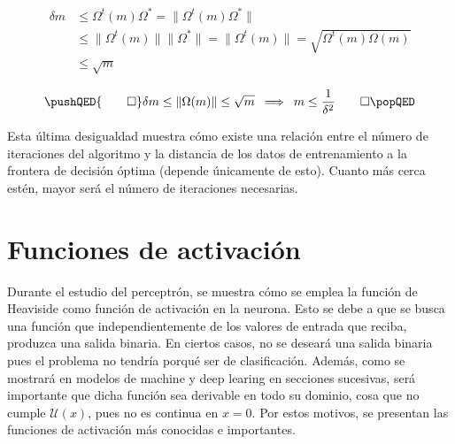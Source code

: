 		\begin{align*}
			\boxed{\delta m} &\leq \Omega^t(m)\Omega^* = \|\Omega^t(m)\Omega^*\|\\
			&\leq \|\Omega^t(m)\| \|\Omega^*\| = \|\Omega^t(m)\| = \sqrt{\Omega^t(m)\Omega(m)}\\
			& \leq \boxed{\sqrt{m}} 
		\end{align*}
		
		$$
		\pushQED{\qed} 
		\delta m \leq \|\Omega(m)\| \leq \sqrt{m} \,\,\, \Longrightarrow \,\,\, m \leq \frac{1}{\delta^2}\qedhere
		\popQED
		$$ 
		
		Esta última desigualdad muestra cómo existe una relación entre el número de iteraciones del algoritmo y la distancia de los datos de entrenamiento a la frontera de decisión óptima (depende únicamente de esto). Cuanto más cerca estén, mayor será el número de iteraciones necesarias. 
		
	\section{Funciones de activación}
	
		Durante el estudio del perceptrón, se muestra cómo se emplea la función de Heaviside como función de activación en la neurona. Esto se debe a que se busca una función que independientemente de los valores de entrada que reciba, produzca una salida binaria. En ciertos casos, no se deseará una salida binaria pues el problema no tendría porqué ser de clasificación. Además, como se mostrará en modelos de machine y deep learing en secciones sucesivas, será importante que dicha función sea derivable en todo su dominio, cosa que no cumple $\mathcal{U}(x)$, pues no es continua en $x=0$. Por estos motivos, se presentan las funciones de activación más conocidas e importantes\cite{funcionesActivacion}. 
		
